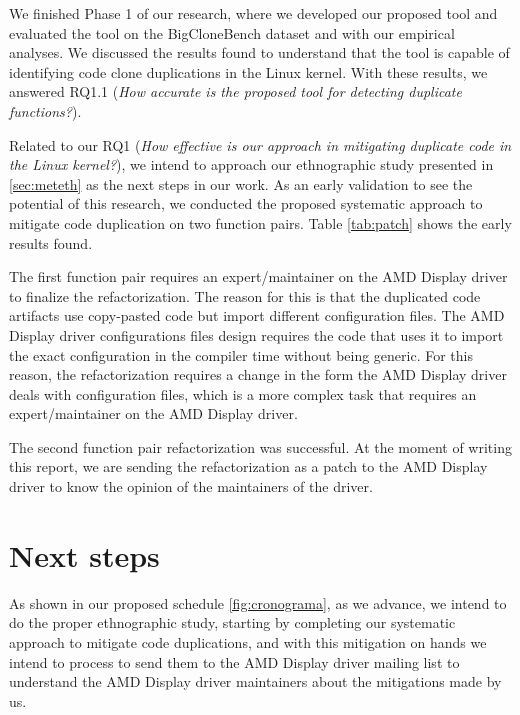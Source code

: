 \en

We finished Phase 1 of our research, where we developed our proposed tool and 
evaluated the tool on the BigCloneBench dataset and with our empirical analyses. 
We discussed the results found to understand that the tool is capable of identifying 
code clone duplications in the Linux kernel. With these results, we answered RQ1.1 
(\textit{How accurate is the proposed tool for detecting duplicate functions?}).

Related to our RQ1
(\textit{How effective is our approach in mitigating duplicate code in the Linux kernel?}),
we intend to approach our ethnographic study presented in \ref{sec:meteth} as the next steps 
in our work. As an early validation to see the potential of this research, we conducted the 
proposed systematic approach to mitigate code duplication on two function pairs. Table
\ref{tab:patch} shows the early results found.




The first function pair requires an expert/maintainer on the AMD Display driver to finalize 
the refactorization. The reason for this is that the duplicated code artifacts use 
copy-pasted code but import different configuration files. The AMD Display driver 
configurations files design requires the code that uses it to import the exact configuration 
in the compiler time without being generic. For this reason, the refactorization requires 
a change in the form the AMD Display driver deals with configuration files, which is a more 
complex task that requires an expert/maintainer on the AMD Display driver.

The second function pair refactorization was successful. At the moment of writing this 
report, we are sending the refactorization as a patch to the AMD Display driver to know 
the opinion of the maintainers of the driver.

\section{Next steps}

As shown in our proposed schedule \ref{fig:cronograma}, as we advance, 
we intend to do the proper ethnographic study, starting by completing our systematic 
approach to mitigate code duplications, and with this mitigation on hands we intend 
to process to send them to the AMD Display driver mailing list to understand the 
AMD Display driver maintainers about the mitigations made by us.


